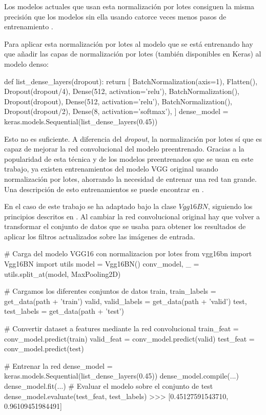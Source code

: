 Los modelos actuales que usan esta normalización por lotes consiguen la misma precisión que los modelos sin ella usando catorce veces menos pasos de entrenamiento \parencite{batch_normalization}.

Para aplicar esta normalización por lotes al modelo que se está entrenando hay que añadir las capas de normalización por lotes (también disponibles en Keras) al modelo denso:

\begin{python}
def list_dense_layers(dropout):
    return [
        BatchNormalization(axis=1),
        Flatten(),
        Dropout(dropout/4),
        Dense(512, activation='relu'),
        BatchNormalization(),
        Dropout(dropout),
        Dense(512, activation='relu'),
        BatchNormalization(),
        Dropout(dropout/2),
        Dense(8, activation='softmax'),
    ]
dense_model = keras.models.Sequential(list_dense_layers(0.45))
\end{python}

Esto no es suficiente. A diferencia del \textit{dropout}, la normalización por lotes sí que es capaz de mejorar la red convolucional del modelo preentrenado. Gracias a la popularidad de esta técnica y de los modelos preentrenados que se usan en este trabajo, ya existen entrenamientos del modelo VGG original usando normalización por lotes, ahorrando la necesidad de entrenar una red tan grande. Una descripción de esto entrenamientos se puede encontrar en \parencite{pretrained_with_bn}.

En el caso de este trabajo se ha adaptado bajo la clase $Vgg16BN$, siguiendo los principios descritos en \parencite{fastai}. Al cambiar la red convolucional original hay que volver a transformar el conjunto de datos que se usaba para obtener los resultados de aplicar los filtros actualizados sobre las imágenes de entrada.

\begin{python}
# Carga del modelo VGG16 con normalizacion por lotes
from vgg16bn import Vgg16BN
import utils
model = Vgg16BN()
conv_model, _ = utils.split_at(model, MaxPooling2D)

# Cargamos los diferentes conjuntos de datos
train, train_labels = get_data(path + 'train')
valid, valid_labels = get_data(path + 'valid')
test, test_labels = get_data(path + 'test')

# Convertir dataset a features mediante la red convolucional
train_feat = conv_model.predict(train)
valid_feat = conv_model.predict(valid)
test_feat = conv_model.predict(test)

# Entrenar la red
dense_model = keras.models.Sequential(list_dense_layers(0.45))
dense_model.compile(...)
dense_model.fit(...)
# Evaluar el modelo sobre el conjunto de test
dense_model.evaluate(test_feat, test_labels)
>>> [0.45127591543710, 0.96109451984491]
\end{python}

